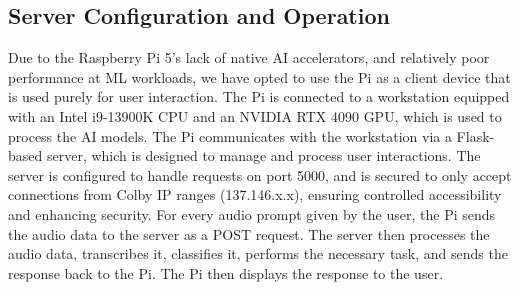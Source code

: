 \documentclass[12pt]{article}
\begin{document}
\subsection{Server Configuration and Operation}
Due to the Raspberry Pi 5's lack of native AI accelerators, and relatively poor performance at ML workloads, we have opted to use the Pi as a client device that is used purely for user interaction. The Pi is connected to a workstation equipped with an Intel i9-13900K CPU and an NVIDIA RTX 4090 GPU, which is used to process the AI models. 
The Pi communicates with the workstation via a Flask-based server, which is designed to manage and process user interactions. The server is configured to handle requests on port 5000, and is secured to only accept connections from Colby IP ranges (137.146.x.x), ensuring controlled accessibility and enhancing security. For every audio prompt given by the user, the Pi sends the audio data to the server as a POST request. The server then processes the audio data, transcribes it, classifies it, performs the necessary task, and sends the response back to the Pi. The Pi then displays the response to the user.
\end{document}
